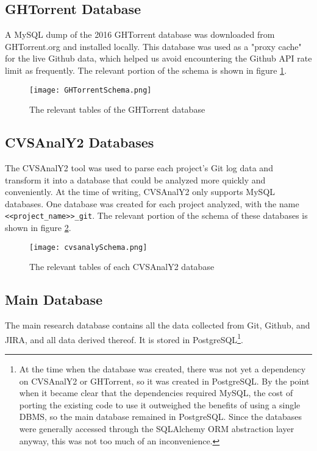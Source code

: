 \subsection{GHTorrent Database}
A MySQL dump of the 2016 GHTorrent database was downloaded from GHTorrent.org and installed locally. This database was used as a "proxy cache" for the live Github data, which helped us  
avoid encountering the Github API rate limit as frequently. The relevant portion of the schema is shown in figure \ref{fig:ghtorrentSchema}.
\begin{figure}
	\texttt{[image: GHTorrentSchema.png]}
	\centering
	\caption{The relevant tables of the GHTorrent database }
	\label{fig:ghtorrentSchema}
\end{figure}
\subsection{CVSAnalY2 Databases}
 The CVSAnalY2 tool\cite{cvsanaly} was used to parse each project's Git log data and transform it into a database that could be analyzed more quickly and conveniently. At the time of writing, CVSAnalY2 only supports MySQL databases. One database was created for each project analyzed, with the name \verb|<<project_name>>_git|. The relevant portion of the schema of these databases is shown in figure \ref{fig:cvsanalySchema}.
\begin{figure}
	\texttt{[image: cvsanalySchema.png]}
	\centering
	\caption{The relevant tables of each CVSAnalY2 database}
	\label{fig:cvsanalySchema}
\end{figure}
\subsection{Main Database}
The main research database contains all the data collected from Git, Github, and JIRA, and all data derived thereof. It is stored in PostgreSQL\footnote{At the time when the database was created, there was not yet a dependency on CVSAnalY2 or GHTorrent, so it was created in PostgreSQL. By the point when it became clear that the dependencies required MySQL, the cost of porting the existing code to use it outweighed the benefits of using a single DBMS, so the main database remained in PostgreSQL. Since the databases were generally accessed through the SQLAlchemy ORM abstraction layer anyway, this was not too much of an inconvenience.}.

